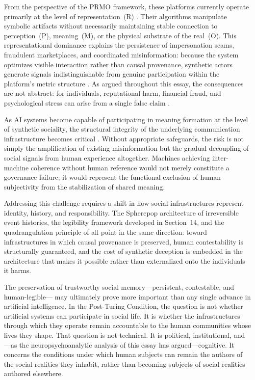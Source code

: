 \documentclass[12pt,a4paper]{article}
\begin{document}
From the perspective of the PRMO framework, these platforms currently operate primarily at the
level of representation~(R) \citep{jelinek2026}. Their algorithms manipulate symbolic
artifacts without necessarily maintaining stable connection to perception~(P), meaning~(M), or
the physical substrate of the real~(O). This representational dominance explains the persistence
of impersonation scams, fraudulent marketplaces, and coordinated misinformation: because the
system optimizes visible interaction rather than causal provenance, synthetic actors generate
signals indistinguishable from genuine participation within the platform's metric structure
\citep{vosoughi2018,tufekci2015}. As argued throughout this essay, the consequences are not
abstract: for individuals, reputational harm, financial fraud, and psychological stress can
arise from a single false claim \citep{noble2018,zuboff2019}.

As AI systems become capable of participating in meaning formation at the level of synthetic
sociality, the structural integrity of the underlying communication infrastructure becomes
critical \citep{jelinek2026}. Without appropriate safeguards, the risk is not simply the
amplification of existing misinformation but the gradual decoupling of social signals from
human experience altogether. Machines achieving inter-machine coherence without human reference
would not merely constitute a governance failure; it would represent the functional exclusion
of human subjectivity from the stabilization of shared meaning.

Addressing this challenge requires a shift in how social infrastructures represent identity,
history, and responsibility. The Spherepop architecture of irreversible event histories, the
legibility framework developed in Section~14, and the quadrangulation principle of
\citet{jelinek2026} all point in the same direction: toward infrastructures in which causal
provenance is preserved, human contestability is structurally guaranteed, and the cost of
synthetic deception is embedded in the architecture that makes it possible rather than
externalized onto the individuals it harms.

The preservation of trustworthy social memory---persistent, contestable, and human-legible---
may ultimately prove more important than any single advance in artificial intelligence. In the
Post-Turing Condition, the question is not whether artificial systems can participate in social
life. It is whether the infrastructures through which they operate remain accountable to the
human communities whose lives they shape. That question is not technical. It is political,
institutional, and---as the neuropsychoanalytic analysis of this essay has argued---cognitive.
It concerns the conditions under which human subjects can remain the authors of the social
realities they inhabit, rather than becoming subjects of social realities authored elsewhere.
\end{document}
